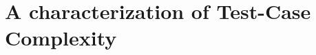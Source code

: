 \chapter[~~~~~~~~~~~~Characterizing Test-case Complexity]{A characterization of Test-Case Complexity}\label{ch:complexity}



